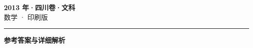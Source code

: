 \documentclass[zihao=5, a4paper]{ctexart}
\begin{document}
\begin{center}
  {\Large\bfseries 2013 年·四川卷·文科}\\[4pt]
  {\large 数学 · 印刷版}
\end{center}
\medskip
{}

\par\bigskip\hrule\bigskip
{}
\Needspace{0.55\textheight}
\begin{center}{\large\bfseries 参考答案与详细解析}\end{center}
\smallskip

\end{document}
